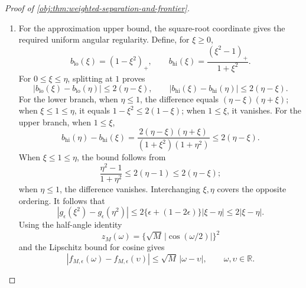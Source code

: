 \documentclass[11pt]{article}
\begin{document}
\begin{proof}[Proof of \cref{obj:thm:weighted-separation-and-frontier}]
\begin{enumerate}
\[\]
The same mass, mean, and moment calculation used for the packet completion shows that
\[
\nu_0^{\mathrm{dual}}
=\sigma_-^{\mathrm{dual}}
 +(1-t_{\mathrm{dual}})\delta_{z_{\mathrm{dual}}^{\mathrm{comp}}},
\qquad
\nu_1^{\mathrm{dual}}
=\sigma_+^{\mathrm{dual}}
 +(1-t_{\mathrm{dual}})\delta_{z_{\mathrm{dual}}^{\mathrm{comp}}}
\]
form a pair in \(\mathfrak N_{K,M}\), with target gap \(\mathcal E\). Hence
\[
\mathcal E\le\Delta.
\]
The feasible set is nonempty, since \((\delta_1,\delta_1)\) is feasible. Its gaps are bounded by \(4e(0)\), by the polynomial residual bound above. Taking the polynomial infimum in that bound, followed by the feasible-pair supremum, therefore gives
\[
\Delta\le4\mathcal E.
\]

\item
For the approximation upper bound, the square-root coordinate gives the required uniform angular regularity. Define, for \(\xi\ge0\),
\[
b_{\mathrm{lo}}(\xi)=(1-\xi^2)_+,
\qquad
b_{\mathrm{hi}}(\xi)=\frac{(\xi^2-1)_+}{1+\xi^2}.
\]
For \(0\le\xi\le\eta\), splitting at \(1\) proves
\[
|b_{\mathrm{lo}}(\xi)-b_{\mathrm{lo}}(\eta)|
\le2(\eta-\xi),
\qquad
|b_{\mathrm{hi}}(\xi)-b_{\mathrm{hi}}(\eta)|
\le2(\eta-\xi).
\]
For the lower branch, when \(\eta\le1\), the difference equals
\((\eta-\xi)(\eta+\xi)\); when \(\xi\le1\le\eta\), it equals
\(1-\xi^2\le2(1-\xi)\); when \(1\le\xi\), it vanishes.
For the upper branch, when \(1\le\xi\),
\[
b_{\mathrm{hi}}(\eta)-b_{\mathrm{hi}}(\xi)
=\frac{2(\eta-\xi)(\eta+\xi)}
       {(1+\xi^2)(1+\eta^2)}
\le2(\eta-\xi).
\]
When \(\xi\le1\le\eta\), the bound follows from
\[
\frac{\eta^2-1}{1+\eta^2}\le2(\eta-1)\le2(\eta-\xi);
\]
when \(\eta\le1\), the difference vanishes. Interchanging \(\xi,\eta\) covers the opposite ordering. It follows that
\[
|g_\epsilon(\xi^2)-g_\epsilon(\eta^2)|
\le
2\{\epsilon+(1-2\epsilon)\}|\xi-\eta|
\le2|\xi-\eta|.
\]
Using the half-angle identity
\[
z_M(\omega)=\{\sqrt M\,|\cos(\omega/2)|\}^2
\]
and the Lipschitz bound for cosine gives
\[
|f_{M,\epsilon}(\omega)-f_{M,\epsilon}(\upsilon)|
\le\sqrt M\,|\omega-\upsilon|,
\qquad \omega,\upsilon\in\mathbb R.
\]


\end{enumerate}
\end{proof}
\end{document}
